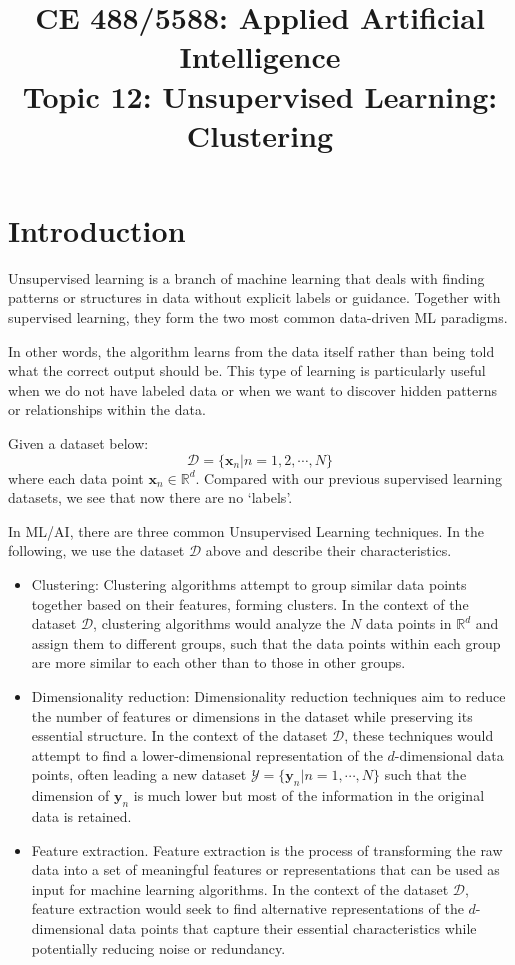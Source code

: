 \documentclass[12pt]{article}
\begin{document}
\doublespacing	

\title{CE 488/5588: Applied Artificial Intelligence\\ \large Topic 12: Unsupervised Learning: Clustering}
\author{}
\date{}
\maketitle

\section{Introduction}

Unsupervised learning is a branch of machine learning that deals with finding patterns or structures in data without explicit labels or guidance. Together with supervised learning, they form the two most common data-driven ML paradigms. 

In other words, the algorithm learns from the data itself rather than being told what the correct output should be. This type of learning is particularly useful when we do not have labeled data or when we want to discover hidden patterns or relationships within the data.

Given a dataset below:
\[
 \mathcal{D} = \{ \bm{x}_n | n = 1, 2, \cdots, N\}
\]
where each data point $\bm{x}_n\in \mathbb{R}^d$. Compared with our previous supervised learning datasets, we see that now there are no `labels'.

In ML/AI, there are three common Unsupervised Learning techniques. In the following, we use the dataset $\mathcal{D}$ above and describe their characteristics.

\begin{itemize}
    \item Clustering: Clustering algorithms attempt to group similar data points together based on their features, forming clusters. In the context of the dataset $\mathcal{D}$, clustering algorithms would analyze the $N$ data points in $\mathbb{R}^d$ and assign them to different groups, such that the data points within each group are more similar to each other than to those in other groups. 
    \item Dimensionality reduction: Dimensionality reduction techniques aim to reduce the number of features or dimensions in the dataset while preserving its essential structure. In the context of the dataset $\mathcal{D}$, these techniques would attempt to find a lower-dimensional representation of the $d$-dimensional data points, often leading a new dataset $\mathcal{Y} = \{\bm{y}_n| n = 1, \cdots, N\}$ such that the dimension of $\bm{y}_n$ is much lower but most of the information in the original data is retained.
    \item Feature extraction. Feature extraction is the process of transforming the raw data into a set of meaningful features or representations that can be used as input for machine learning algorithms. In the context of the dataset $\mathcal{D}$, feature extraction would seek to find alternative representations of the $d$-dimensional data points that capture their essential characteristics while potentially reducing noise or redundancy. 
\end{itemize}
\end{document}
